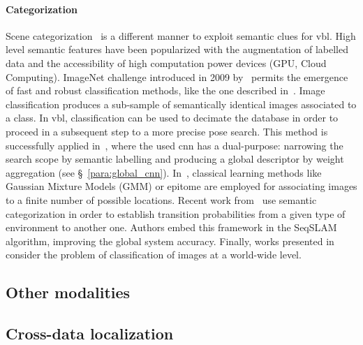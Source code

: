 		\paragraph{Categorization}
			Scene categorization~\citep{Wu2009} is a different manner to exploit semantic clues for \ac{vbl}. High level semantic features have been popularized with the augmentation of labelled data and the accessibility of high computation power devices (GPU, Cloud Computing). ImageNet challenge introduced in 2009 by~\citep{Deng2009} permits the emergence of fast and robust classification methods, like the one described in~\citep{Krizhevsky2012}. Image classification produces a sub-sample of semantically identical images associated to a class. In \ac{vbl}, classification can be used to decimate the database in order to proceed in a subsequent step to a more precise pose search. This method is successfully applied in~\citep{Sunderhauf2015}, where the used \ac{cnn} has a dual-purpose: narrowing the search scope by semantic labelling and producing a global descriptor by weight aggregation (see \S~\ref{para:global_cnn}). In~\citep{torralba2003context,Ni2009}, classical learning methods like Gaussian Mixture Models (GMM) or epitome are employed for associating images to a finite number of possible locations. Recent work from~\citep{Garg2017} use semantic categorization in order to establish transition probabilities from a given type of environment to another one. Authors embed this framework in the SeqSLAM algorithm, improving the global system accuracy. Finally, works presented in~\citep{Hays2008,Weyand2016} consider the problem of classification of images at a world-wide level.

	\subsection{Other modalities}
	\label{subsec:other_modalities}        	
	\citep{Lu2016}
	
	\citep{Bonardi2017}
	
	\citep{Rastgoo2018}
		
				
	\subsection{Cross-data localization}
	
	
